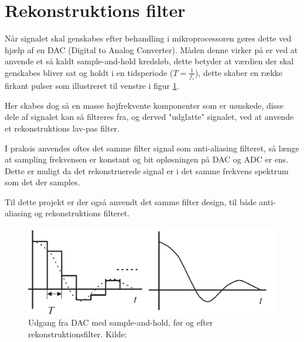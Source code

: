 \section{Rekonstruktions filter}

Når signalet skal genskabes efter behandling i mikroprocessoren gøres dette ved hjælp af en DAC (Digital to Analog Converter). 
Måden denne virker på er ved at anvende et så kaldt sample-and-hold kredsløb,
dette betyder at værdien der skal genskabes bliver sat og holdt i en
tidsperiode ($T=\frac{1}{f_s}$), dette skaber en række firkant pulser som
illustreret til venstre i figur \ref{fig:samplholdrecon}.

Her skabes dog så en masse højfrekvente komponenter som er uønskede, disse dele af signalet kan så filtreres fra, og derved "udglatte" signalet, ved at anvende et rekonstruktions lav-pas filter.

I praksis anvendes oftes det samme filter signal som anti-aliasing filteret,
så længe at sampling frekvensen er konstant og bit opløsningen på DAC og ADC
er ens. Dette er muligt da det rekonstruerede signal er i det samme frekvens
spektrum som det der samples.

Til dette projekt er der også anvendt det samme filter design, til både anti-aliasing og rekonstruktions filteret.

\begin{figure}[H]
	\centering
	\includegraphics[width=0.6\linewidth]{billeder/dacrecon}
	\caption{Udgang fra DAC med sample-and-hold, før og efter rekonstruktionsfilter. Kilde:\cite{Tan2013}}
	\label{fig:samplholdrecon}
\end{figure}

